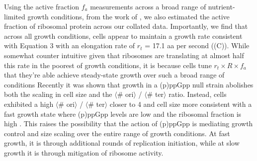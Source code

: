 Using the active fraction $f_a$ measurements across a broad range of
nutrient-limited growth conditions, from the work of \cite{dai2016}, we also
estimated the active fraction of ribosomal protein across our collated data.
Importantly, we find that across all growth conditions, cells appear to maintain
a growth rate consistent with Equation 3 with an elongation rate of $r_t$ = 17.1
aa per second ((C)). While somewhat counter
intuitive given that ribosomes are translating at almost half this rate in the
poorest of growth conditions, it is because cells tune $r_t \times R \times f_a$
that they're able achieve steady-state growth over such a broad range of
conditions Recently it was shown that growth in a (p)ppGpp null strain abolishes
both the scaling in cell size and the $\langle$\# ori$\rangle$ / $\langle$\#
ter$\rangle$ ratio. Instead, cells exhibited a high $\langle$\# ori$\rangle$ /
$\langle$\# ter$\rangle$ closer to 4 and cell size more consistent with a fast
growth state where (p)ppGpp levels are low \citep{fernandezcoll2020} and the
ribosomal fraction  is high \citep{zhu2019}. This raises the possibility that
the action of (p)ppGpp is mediating growth control and size scaling over the
entire range of growth conditions. At fast growth, it is through additional
rounds of replication initiation, while at slow growth it is through mitigation
of ribosome activity.




%
